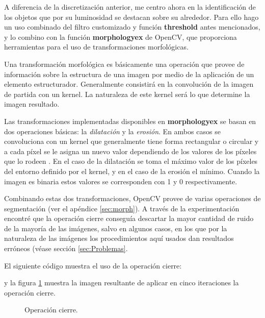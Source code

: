 \documentclass[a4paper,12pt]{article}
\begin{document}
A diferencia de la discretización anterior, me centro ahora en la identificación de los objetos que por su luminosidad se destacan sobre su alrededor. Para ello hago un uso combinado del filtro customizado y función \textbf{threshold} antes mencionados, y lo combino con la función \textbf{morphologyex}\cite{morphologyex} de OpenCV, que proporciona herramientas para el uso de transformaciones morfológicas.

Una transformación morfológica es básicamente una operación que provee de información sobre la estructura de una imagen por medio de la aplicación de un elemento estructurador. Generalmente consistirá en la convolución de la imagen de partida con un kernel. La naturaleza de este kernel será lo que determine la imagen resultado.

Las transformaciones implementadas disponibles en \textbf{morphologyex} se basan en dos operaciones básicas: la \textit{dilatación} y la \textit{erosión}. En ambos casos se convoluciona con un kernel que generalmente tiene forma rectangular o circular y a cada píxel se le asigna un nuevo valor dependiendo de los valores de los píxeles que lo rodeen . En el caso de la dilatación se toma el máximo valor de los píxeles del entorno definido por el kernel, y en el caso de la erosión el mínimo. Cuando la imagen es binaria estos valores se corresponden con 1 y 0 respectivamente.

Combinando estas dos transformaciones, OpenCV provee de varias operaciones de segmentación (ver el apéndice \ref{sec:morph}).
A través de la experimentación encontré que la operación cierre conseguía descartar la mayor cantidad de ruido de la mayoría de las imágenes, salvo en algunos casos, en los que por la naturaleza de las imágenes los procedimientos aquí usados dan resultados erróneos (véase sección \ref{sec:Problemas}.

El siguiente código muestra el uso de la operación cierre:

y la figura \ref{fig:img4} muestra la imagen resultante de aplicar en cinco iteraciones la operación cierre.
\begin{figure}[h!]
\centering
{}
\caption{Operación cierre.}
\label{fig:img4}
\end{figure}
\end{document}
